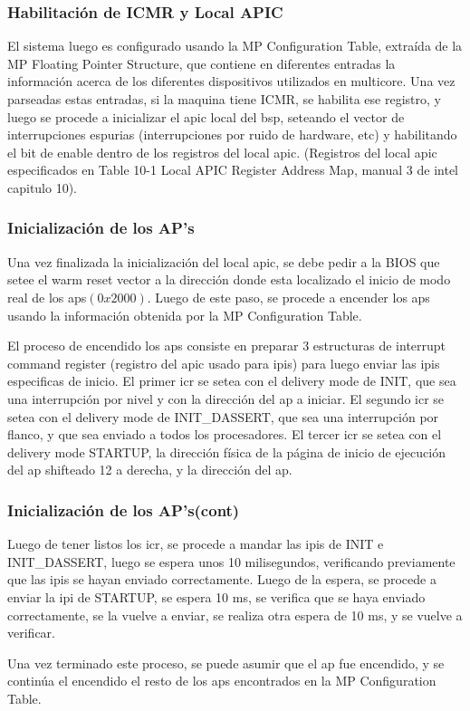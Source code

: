 \documentclass{beamer}
\begin{document}
	\begin{frame}
		\frametitle{Habilitación de ICMR y Local APIC}
		El sistema luego es configurado usando la MP Configuration Table, extraída de la MP Floating Pointer Structure, que contiene en diferentes entradas la información acerca de los diferentes dispositivos utilizados en multicore.
		Una vez parseadas estas entradas, si la maquina tiene ICMR, se habilita ese registro, y luego se procede a inicializar el apic local del bsp, seteando el vector de interrupciones espurias (interrupciones por ruido de hardware, etc) y habilitando el bit de enable dentro de los registros del local apic. (Registros del local apic especificados en Table 10-1 Local APIC Register Address Map, manual 3 de intel capitulo 10).
	\end{frame}

	\begin{frame}
		\frametitle{Inicialización de los AP's}

		Una vez finalizada la inicialización del local apic, se debe pedir a la BIOS que setee el warm reset vector a la dirección donde esta localizado el inicio de modo real de los aps$(0x2000)$. Luego de este paso, se procede a encender los aps usando la información obtenida por la MP Configuration Table.

		El proceso de encendido los aps consiste en preparar 3 estructuras de interrupt command register (registro del apic usado para ipis) para luego enviar las ipis especificas de inicio. El primer icr se setea con el delivery mode de INIT, que sea una interrupción por nivel y con la dirección del ap a iniciar. El segundo icr se setea con el delivery mode de INIT\_DASSERT, que sea una interrupción por flanco, y que sea enviado a todos los procesadores. El tercer icr se setea con el delivery mode STARTUP, la dirección física de la página de inicio de ejecución del ap shifteado 12 a derecha, y la dirección del ap.
	\end{frame}

	\begin{frame}
		\frametitle{Inicialización de los AP's(cont)}
		Luego de tener listos los icr, se procede a mandar las ipis de INIT e INIT\_DASSERT, luego se espera unos 10 milisegundos, verificando previamente que las ipis se hayan enviado correctamente. Luego de la espera, se procede a enviar la ipi de STARTUP, se espera 10 ms, se verifica que se haya enviado correctamente, se la vuelve a enviar, se realiza otra espera de 10 ms, y se vuelve a verificar.

		Una vez terminado este proceso, se puede asumir que el ap fue encendido, y se continúa el encendido el resto de los aps encontrados en la MP Configuration Table.\\
	\end{frame}
\end{document}
